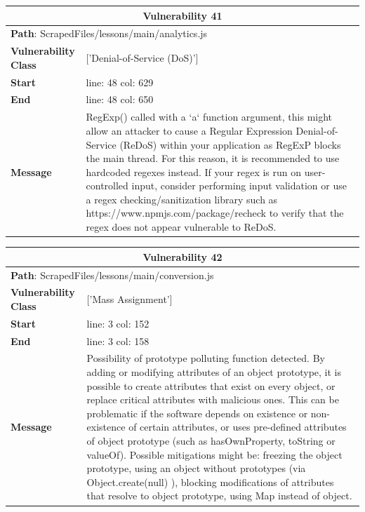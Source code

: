 \documentclass[12pt]{article}
\begin{document}
\vspace{0.7cm}
\FloatBarrier
\begin{table}[!h]
\centering
\renewcommand{\arraystretch}{1.3}
\begin{tabular}{|l|p{10cm}|}
\hline
\multicolumn{2}{|c|}{\textbf{Vulnerability 41}} \\
\hline
\multicolumn{2}{|l|}{\textbf{Path}: ScrapedFiles/lessons/main/analytics.js} \\
\hline
\textbf{Vulnerability Class} & ['Denial-of-Service (DoS)'] \\
\hline
\textbf{Start} & line: 48 \quad col: 629 \\
\hline
\textbf{End} & line: 48 \quad col: 650 \\
\hline
\textbf{Message} & RegExp() called with a `a` function argument, this might allow an attacker to cause a Regular Expression Denial-of-Service (ReDoS) within your application as RegExP blocks the main thread. For this reason, it is recommended to use hardcoded regexes instead. If your regex is run on user-controlled input, consider performing input validation or use a regex checking/sanitization library such as https://www.npmjs.com/package/recheck to verify that the regex does not appear vulnerable to ReDoS. \\
\hline
\end{tabular}
\end{table}
\vspace{0.7cm}
\FloatBarrier
\begin{table}[!h]
\centering
\renewcommand{\arraystretch}{1.3}
\begin{tabular}{|l|p{10cm}|}
\hline
\multicolumn{2}{|c|}{\textbf{Vulnerability 42}} \\
\hline
\multicolumn{2}{|l|}{\textbf{Path}: ScrapedFiles/lessons/main/conversion.js} \\
\hline
\textbf{Vulnerability Class} & ['Mass Assignment'] \\
\hline
\textbf{Start} & line: 3 \quad col: 152 \\
\hline
\textbf{End} & line: 3 \quad col: 158 \\
\hline
\textbf{Message} & Possibility of prototype polluting function detected. By adding or modifying attributes of an object prototype, it is possible to create attributes that exist on every object, or replace critical attributes with malicious ones. This can be problematic if the software depends on existence or non-existence of certain attributes, or uses pre-defined attributes of object prototype (such as hasOwnProperty, toString or valueOf). Possible mitigations might be: freezing the object prototype, using an object without prototypes (via Object.create(null) ), blocking modifications of attributes that resolve to object prototype, using Map instead of object. \\
\hline
\end{tabular}
\end{table}
\end{document}
